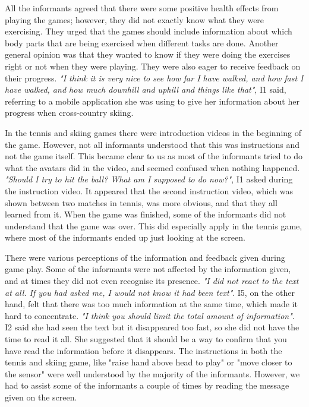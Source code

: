 All the informants agreed that there were some positive health effects from playing the games; however, they did not exactly know what they were exercising. They urged that the games should include information about which body parts that are being exercised when different tasks are done. Another general opinion was that they wanted to know if they were doing the exercises right or not when they were playing. They were also eager to receive feedback on their progress. \emph{"I think it is very nice to see how far I have walked, and how fast I have walked, and how much downhill and uphill and things like that"}, I1 said, referring to a mobile application she was using to give her information about her progress when cross-country skiing.   

In the tennis and skiing games there were introduction videos in the beginning of the game. However, not all informants understood that this was instructions and not the game itself. This became clear to us as most of the informants tried to do what the avatars did in the video, and seemed confused when nothing happened. \emph{"Should I try to hit the ball? What am I supposed to do now?"}, I1 asked during the instruction video. It appeared that the second instruction video, which was shown between two matches in tennis, was more obvious, and that they all learned from it. When the game was finished, some of the informants did not understand that the game was over. This did especially apply in the tennis game, where most of the informants ended up just looking at the screen. 

There were various perceptions of the information and feedback given during game play. Some of the informants were not affected by the information given, and at times they did not even recognise its presence. \emph{"I did not react to the text at all. If you had asked me, I would not know it had been text"}. I5, on the other hand, felt that there was too much information at the same time, which made it hard to concentrate. \emph{"I think you should limit the total amount of information"}. I2 said she had seen the text but it disappeared too fast, so she did not have the time to read it all. She suggested that it should be a way to confirm that you have read the information before it disappears. The instructions in both the tennis and skiing game, like "raise hand above head to play" or "move closer to the sensor" were well understood by the majority of the informants. However, we had to assist some of the informants a couple of times by reading the message given on the screen.  

